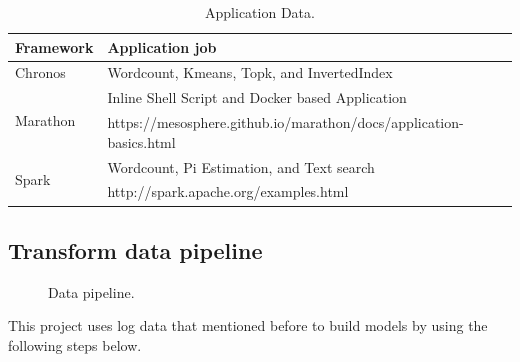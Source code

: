 \documentclass[12pt,oneside,openright,a4paper]{cpe-english-project}
\begin{document}
\begin{table}[!h]
  \caption{Application Data.}\label{tbl:ApplicationData}
    \begin{tabular}{@{}|p{}|p{}|}
    \hline
    \textbf{Framework} & \textbf{Application job}\\
    \hline
    Chronos & Wordcount, Kmeans, Topk, and InvertedIndex\\
    \hline
    \multirow{2}{*}{Marathon} & Inline Shell Script and Docker based Application \\
    & https://mesosphere.github.io/marathon/docs/application-basics.html\\
    \hline
    \multirow{2}{*}{Spark} & Wordcount, Pi Estimation, and Text search\\
    & http://spark.apache.org/examples.html\\
    \hline
  \end{tabular}
\end{table}

\newpage

\subsection{Transform data pipeline}

\begin{figure}[!h]\centering
  \setlength{\fboxrule}{0mm} %
  \setlength{\fboxsep}{0cm}
  \caption{Data pipeline.}\label{fig:dataPipeline}
\end{figure}

This project uses log data that mentioned before to build models by using the following steps below.
\end{document}
